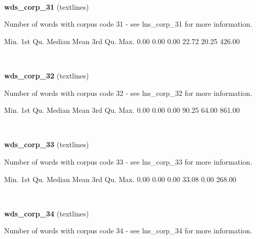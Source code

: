 \documentclass[]{article}
\newenvironment{Shaded}{\begin{snugshade}}{\end{snugshade}}
\newcommand{\FloatTok}[1]{\textcolor[rgb]{0.00,0.00,0.81}{{#1}}}
\newcommand{\NormalTok}[1]{{#1}}
\begin{document}
~

\vspace{1em}

\textbf{wds\_corp\_31} (textlines)

Number of words with corpus code 31 - see lns\_corp\_31 for more
information.

\begin{Shaded}
\begin{Highlighting}[]
   \NormalTok{Min. 1st Qu.  Median    Mean 3rd Qu.    Max. }
   \FloatTok{0.00}    \FloatTok{0.00}    \FloatTok{0.00}   \FloatTok{22.72}   \FloatTok{20.25}  \FloatTok{426.00} 
\end{Highlighting}
\end{Shaded}

~

\vspace{1em}

\textbf{wds\_corp\_32} (textlines)

Number of words with corpus code 32 - see lns\_corp\_32 for more
information.

\begin{Shaded}
\begin{Highlighting}[]
   \NormalTok{Min. 1st Qu.  Median    Mean 3rd Qu.    Max. }
   \FloatTok{0.00}    \FloatTok{0.00}    \FloatTok{0.00}   \FloatTok{90.25}   \FloatTok{64.00}  \FloatTok{861.00} 
\end{Highlighting}
\end{Shaded}

~

\vspace{1em}

\textbf{wds\_corp\_33} (textlines)

Number of words with corpus code 33 - see lns\_corp\_33 for more
information.

\begin{Shaded}
\begin{Highlighting}[]
   \NormalTok{Min. 1st Qu.  Median    Mean 3rd Qu.    Max. }
   \FloatTok{0.00}    \FloatTok{0.00}    \FloatTok{0.00}   \FloatTok{33.08}    \FloatTok{0.00}  \FloatTok{268.00} 
\end{Highlighting}
\end{Shaded}

~

\vspace{1em}

\textbf{wds\_corp\_34} (textlines)

Number of words with corpus code 34 - see lns\_corp\_34 for more
information.
\end{document}
